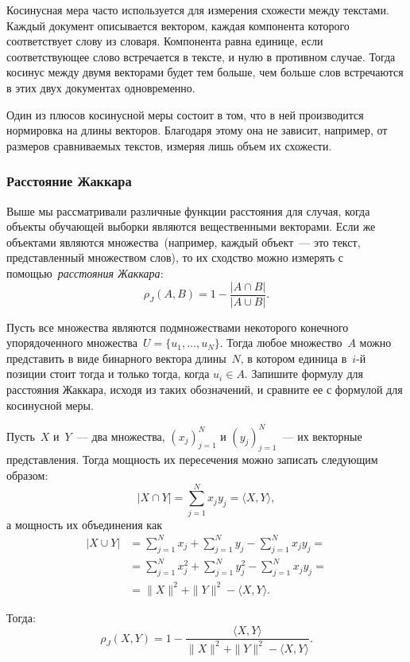 \documentclass[12pt,fleqn]{article}
\begin{document}
        Косинусная мера часто используется для измерения схожести между текстами.
        Каждый документ описывается вектором, каждая компонента которого соответствует
        слову из словаря.
        Компонента равна единице, если соответствующее слово встречается в тексте, и нулю в противном случае.
        Тогда косинус между двумя векторами будет тем больше, чем больше слов встречаются в этих двух документах одновременно.

        Один из плюсов косинусной меры состоит в том, что в ней производится нормировка на
        длины векторов.
        Благодаря этому она не зависит, например, от размеров сравниваемых текстов,
        измеряя лишь объем их схожести.

        \subsubsection{Расстояние Жаккара}
        Выше мы рассматривали различные функции расстояния для случая,
        когда объекты обучающей выборки являются вещественными векторами.
        Если же объектами являются множества~(например, каждый объект~--- это текст,
        представленный множеством слов),
        то их сходство можно измерять с помощью~\emph{расстояния Жаккара}:
        \[
            \rho_J(A, B) = 1 - \frac{|A \cap B|}{|A \cup B|}.
        \]

        \begin{vkProblem}
            Пусть все множества являются подмножествами некоторого конечного упорядоченного
            множества~$U = \{u_1, \dots, u_N\}$.
            Тогда любое множество~$A$ можно представить в виде бинарного вектора длины~$N$,
            в котором единица в~$i$-й позиции стоит тогда и только тогда, когда $u_i \in A$.
            Запишите формулу для расстояния Жаккара, исходя из таких обозначений, и сравните
            ее с формулой для косинусной меры.
        \end{vkProblem}

        \begin{esSolution}
            Пусть~$X$ и~$Y$~--- два множества, $(x_j)_{j = 1}^{N}$ и $(y_j)_{j = 1}^{N}$~---
            их векторные представления.
            Тогда мощность их пересечения можно записать следующим образом:
            \[
                |X \cap Y| = \sum_{j = 1}^{N} x_j y_j = \langle X, Y \rangle,
            \]
            а мощность их объединения как
            \begin{align*}
                |X \cup Y| &=
                \sum_{j = 1}^{N} x_j + \sum_{j = 1}^{N} y_j - \sum_{j = 1}^{N} x_j y_j = \\
                &= \sum_{j = 1}^{N} x_j^2 + \sum_{j = 1}^{N} y_j^2 - \sum_{j = 1}^{N} x_j y_j = \\
                &= \|X\|^2 + \|Y\|^2 - \langle X, Y \rangle.
            \end{align*}

            Тогда:
            \[
                \rho_J(X, Y) = 1 - \frac{\langle X, Y \rangle}{\|X\|^2 + \|Y\|^2 - \langle X, Y \rangle}.
            \]
        \end{esSolution}
\end{document}
